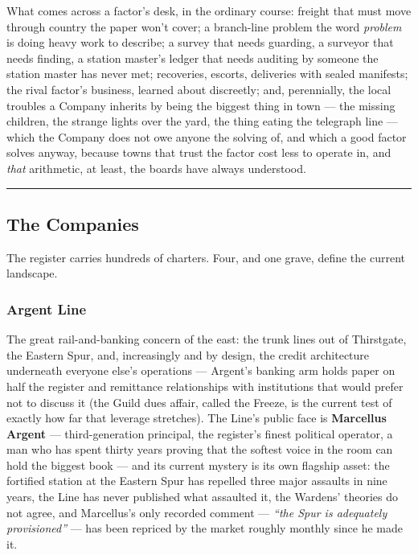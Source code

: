What comes across a factor's desk, in the ordinary course: freight that must move through country the paper won't cover; a branch-line problem the word \textit{problem} is doing heavy work to describe; a survey that needs guarding, a surveyor that needs finding, a station master's ledger that needs auditing by someone the station master has never met; recoveries, escorts, deliveries with sealed manifests; the rival factor's business, learned about discreetly; and, perennially, the local troubles a Company inherits by being the biggest thing in town --- the missing children, the strange lights over the yard, the thing eating the telegraph line --- which the Company does not owe anyone the solving of, and which a good factor solves anyway, because towns that trust the factor cost less to operate in, and \textit{that} arithmetic, at least, the boards have always understood.

\medskip\hrule\medskip

\subsection{The Companies}

The register carries hundreds of charters. Four, and one grave, define the current landscape.

\subsubsection{Argent Line}

The great rail-and-banking concern of the east: the trunk lines out of Thirstgate, the Eastern Spur, and, increasingly and by design, the credit architecture underneath everyone else's operations --- Argent's banking arm holds paper on half the register and remittance relationships with institutions that would prefer not to discuss it (the Guild dues affair, called the Freeze, is the current test of exactly how far that leverage stretches). The Line's public face is \textbf{Marcellus Argent} --- third-generation principal, the register's finest political operator, a man who has spent thirty years proving that the softest voice in the room can hold the biggest book --- and its current mystery is its own flagship asset: the fortified station at the Eastern Spur has repelled three major assaults in nine years, the Line has never published what assaulted it, the Wardens' theories do not agree, and Marcellus's only recorded comment --- \textit{``the Spur is adequately provisioned''} --- has been repriced by the market roughly monthly since he made it.

